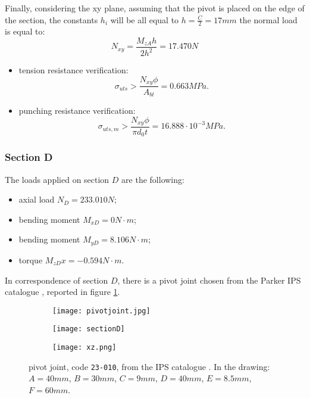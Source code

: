 Finally, considering the xy plane, assuming that the pivot is placed on the edge of the section, the constants $h_{i}$ will be all equal to $h = \frac{C}{2} = 17 mm$ the normal load is equal to: \\
\begin{equation*}
    N_{xy} = \frac{M_{zA}h}{2h^{2}} = 17.470 N
\end{equation*}
\begin{itemize}
    \item tension resistance verification:
     \begin{equation*}
       \sigma_{uts} > \frac{N_{xy}\phi}{A_{bt}} = 0.663 MPa.
    \end{equation*}
    \item punching resistance verification:
     \begin{equation*}
       \sigma_{uts,m} > \frac{N_{xy}\phi}{\pi d_{0}t} = 16.888 \cdot 10^{-3} MPa.
    \end{equation*}
\end{itemize}
\subsubsection*{Section D}
The loads applied on section $D$ are the following:
\begin{itemize}
	\item axial load $N_{D} = 233.010 N$;
	\item bending moment $M_{xD} = 0 N\cdot m$; 
	\item bending moment $M_{yD} = 8.106 N\cdot m$; 
	\item torque $M_{zD}x = -0.594 N\cdot m$.
\end{itemize}
In correspondence of section $D$, there is a pivot joint chosen from the Parker IPS catalogue \cite{parker-ds}, reported in figure \ref{fig:pivot}.
\begin{figure}[h!]
    \centering
    \begin{subfigure}{0.32\linewidth}
    	\centering \texttt{[image: pivotjoint.jpg]} \caption{}
    \end{subfigure}
	\begin{subfigure}{0.32\linewidth}
		\centering \texttt{[image: sectionD]} \caption{}
	\end{subfigure}
	\begin{subfigure}{0.32\linewidth}
		\centering \texttt{[image: xz.png]} \caption{}
	\end{subfigure}    
    \caption{pivot joint, code \texttt{23-010}, from the IPS catalogue \cite{parker-ds}. In the drawing: $A = 40mm$, $B=30mm$, $C=9mm$, $D=40mm$, $E=8.5mm$, $F=60mm$.}
    \label{fig:pivot}
\end{figure}

